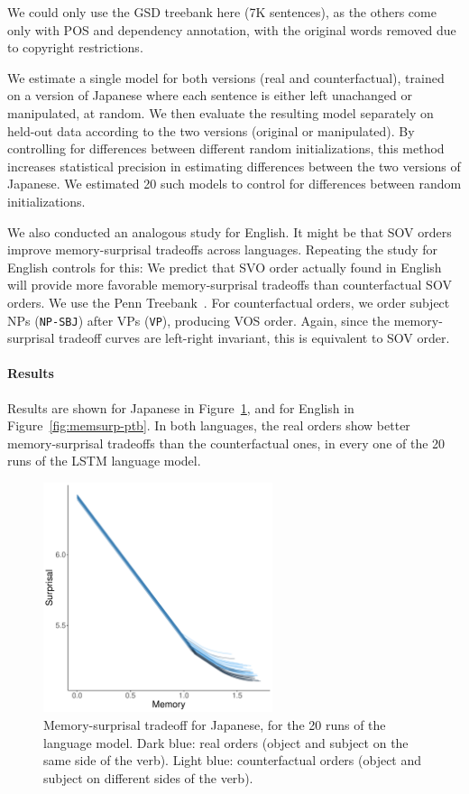 \documentclass[11pt,a4paper]{article}
\begin{document}
We could only use the GSD treebank here (7K sentences), as the others come only with POS and dependency annotation, with the original words removed due to copyright restrictions.

We estimate a single model for both versions (real and counterfactual), trained on a version of Japanese where each sentence is either left unachanged or manipulated, at random.
We then evaluate the resulting model separately on held-out data according to the two versions (original or manipulated).
By controlling for differences between different random initializations, this method increases statistical precision in estimating differences between the two versions of Japanese.
We estimated 20 such models to control for differences between random initializations.

We also conducted an analogous study for English.
It might be that SOV orders improve memory-surprisal tradeoffs across languages.
Repeating the study for English controls for this:
We predict that SVO order actually found in English will provide more favorable memory-surprisal tradeoffs than counterfactual SOV orders.
We use the Penn Treebank~\citep{marcus-building-1993}.
For counterfactual orders, we order subject NPs (\texttt{NP-SBJ}) after VPs (\texttt{VP}), producing VOS order.
Again, since the memory-surprisal tradeoff curves are left-right invariant, this is equivalent to SOV order.


\paragraph{Results}

Results are shown for Japanese in Figure~\ref{fig:memsurp-jap}, and for English in Figure~\ref{fig:memsurp-ptb}.
In both languages, the real orders show better memory-surprisal tradeoffs than the counterfactual ones, in every one of the 20 runs of the LSTM language model.




\begin{figure}
    \centering
    \includegraphics[width=0.6\textwidth]{figures/japanese-memsurp.pdf}
\caption{Memory-surprisal tradeoff for Japanese, for the 20 runs of the language model. Dark blue: real orders (object and subject on the same side of the verb). Light blue: counterfactual orders (object and subject on different sides of the verb).}\label{fig:memsurp-jap}
\end{figure}
\end{document}
